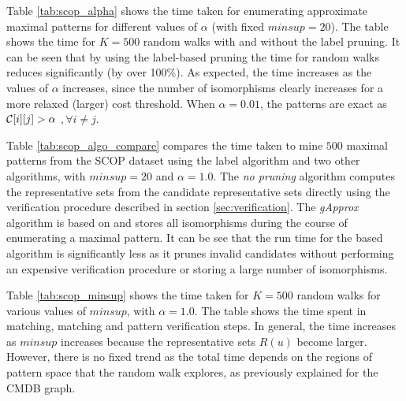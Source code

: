 \smallskip{} Table \ref{tab:scop_alpha} shows
the time taken for enumerating approximate maximal patterns for
different values of $\alpha$ (with fixed $minsup = 20$). The table shows
the time for $K=500$ random walks with and without the label pruning. It
can be seen that by using the label-based pruning the time for random
walks reduces significantly (by over 100\%).  As expected, the time
increases as the values of $\alpha$ increases, since the number of
isomorphisms clearly increases for a more relaxed (larger) cost
threshold.  When $\alpha = 0.01$, the patterns are exact as
$\mathcal{C}[i][j] > \alpha$ $,\forall i \neq j$.

Table \ref{tab:scop_algo_compare} compares the time taken to mine $500$
maximal patterns from the SCOP dataset using the \ncl label algorithm
and two other algorithms, with $minsup=20$ and $\alpha=1.0$.  The
\textit{no pruning} algorithm computes the representative sets from the
candidate representative sets directly using the verification procedure
described in section \ref{sec:verification}. The \textit{gApprox}
algorithm is based on \cite{gapprox} and stores all isomorphisms during
the course of enumerating a maximal pattern. It can be see
that the run time for the \ncl based algorithm is significantly less
as it prunes invalid
candidates without performing an expensive verification procedure or
storing a large number of isomorphisms.


Table \ref{tab:scop_minsup} shows the time taken for $K=500$ random walks
for various values of $minsup$, with $\alpha = 1.0$. The
table shows the time spent in \khop matching, \ncl matching
and pattern verification steps. In general, the time
increases as $minsup$ increases because the representative sets
$R(u)$ become larger. However, there is no fixed trend as the total time
depends on the regions of pattern space that the random walk explores,
as previously explained for the CMDB graph.

